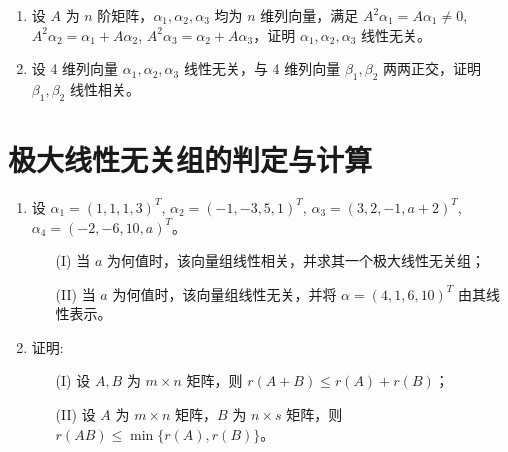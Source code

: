 \documentclass[12pt, a4paper, oneside, UTF8]{ctexbook}
\begin{document}
\begin{enumerate}
    \item 设 $A$ 为 $n$ 阶矩阵，$\alpha_1, \alpha_2, \alpha_3$ 均为 $n$ 维列向量，满足 $A^2\alpha_1 = A\alpha_1 \neq 0$, $A^2\alpha_2 = \alpha_1 + A\alpha_2$,
    $A^2\alpha_3 = \alpha_2 + A\alpha_3$，证明 $\alpha_1, \alpha_2, \alpha_3$ 线性无关。
    
    \begin{solution}
    \newpage
    \end{solution}
    
    \item 设 4 维列向量 $\alpha_1, \alpha_2, \alpha_3$ 线性无关，与 4 维列向量 $\beta_1, \beta_2$ 两两正交，证明 $\beta_1, \beta_2$ 线性相关。
    
    \begin{solution}
    \newpage
    \end{solution}
\end{enumerate}

\section{极大线性无关组的判定与计算}

\begin{enumerate}
    \item 设 $\alpha_1 = (1,1,1,3)^T$, $\alpha_2 = (-1,-3,5,1)^T$, $\alpha_3 = (3,2,-1, a+2)^T$, $\alpha_4 = (-2,-6,10, a)^T$。
    \begin{enumerate}
        \item [(I)] 当 $a$ 为何值时，该向量组线性相关，并求其一个极大线性无关组；
        \item [(II)] 当 $a$ 为何值时，该向量组线性无关，并将 $\alpha = (4,1,6,10)^T$ 由其线性表示。
    \end{enumerate}
    
    \begin{solution}
    \newpage
    \end{solution}
    
    \item 证明:
    \begin{enumerate}
        \item [(I)] 设 $A, B$ 为 $m \times n$ 矩阵，则 $r(A+B) \leq r(A) + r(B)$；
        \item [(II)] 设 $A$ 为 $m \times n$ 矩阵，$B$ 为 $n \times s$ 矩阵，则 $r(AB) \leq \min\{r(A), r(B)\}$。
    \end{enumerate}
    
    \begin{solution}
    \newpage
    \end{solution}
\end{enumerate}
\end{document}
